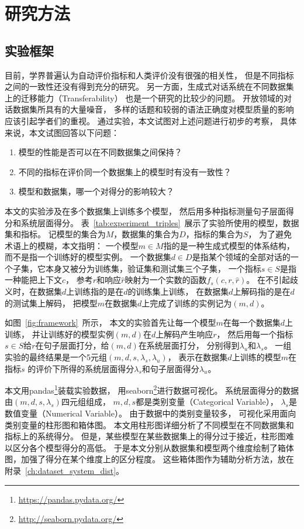 \chapter{研究方法}\label{ch:method}

\section{实验框架}\label{sec:eval_framework}
目前，学界普遍认为自动评价指标和人类评价没有很强的相关性，
但是不同指标之间的一致性还没有得到充分的研究。
另一方面，生成式对话系统在不同数据集上的迁移能力（Transferability）
也是一个研究的比较少的问题。
开放领域的对话数据集所具有的大量噪音，
多样的话题和较弱的语法正确度对模型质量的影响应该引起学者们的重视。
通过实验，本文试图对上述问题进行初步的考察，
具体来说，本文试图回答以下问题：
\begin{enumerate}
    \item 模型的性能是否可以在不同数据集之间保持？
    \item 不同的指标在评价同一个数据集上的模型时有没有一致性？
    \item 模型和数据集，哪一个对得分的影响较大？
\end{enumerate}

本文的实验涉及在多个数据集上训练多个模型，
然后用多种指标测量句子层面得分和系统层面得分。
表~\ref{tab:experiment_triples}~展示了实验所使用的模型，数据集和指标。
记模型的集合为$M$，数据集的集合为$D$，指标的集合为$S$，
为了避免术语上的模糊，本文指明：
一个模型$m \in M$指的是一种生成式模型的体系结构，而不是指一个训练好的模型实例。
一个数据集$d \in D$是指某个领域的全部对话的一个子集，它本身又被分为训练集，验证集和测试集三个子集，
一个指标$s \in S$是指一种能把上下文$c$，
参考$r$和响应$\hat{r}$映射为一个实数的函数$f_s(c, r, \hat{r})$。
在不引起歧义时，在数据集$d$上训练指的是在$d$的训练集上训练，
在数据集$d$上解码指的是在$d$的测试集上解码，
把模型$m$在数据集$d$上完成了训练的实例记为$(m, d)$。

如图~\ref{fig:framework}~所示，
本文的实验首先让每一个模型$m$在每一个数据集$d$上训练，
并让训练好的模型实例$(m, d)$在$d$上解码产生响应$r$，
然后用每一个指标$s \in S$给$r$在句子层面打分，给$(m, d)$在系统层面打分，
分别得到$\lambda_{u}$和$\lambda_{s}$。
一组实验的最终结果是一个5元组$(m, d, s, \lambda_{s}, \lambda_{u})$，
表示在数据集$d$上训练的模型$m$在指标$s$
的评价下所得的系统层面得分$\lambda_s$和句子层面得分$\lambda_u$。

本文用pandas\footnote{\url{https://pandas.pydata.org/}}装载实验数据，
用seaborn\footnote{\url{http://seaborn.pydata.org/}}进行数据可视化。
系统层面得分的数据由$(m, d, s, \lambda_s)$四元组组成，
$m, d, s$都是类别变量（Categorical Variable），
$\lambda_s$是数值变量（Numerical Variable）。
由于数据中的类别变量较多，
可视化采用面向类别变量的柱形图和箱体图。
本文用柱形图详细分析了不同模型在不同数据集和指标上的系统得分。
但是，某些模型在某些数据集上的得分过于接近，柱形图难以区分各个模型得分的高低。
于是本文分别从数据集和模型两个维度绘制了箱体图，加强了得分在某个维度上的区分程度。
这些箱体图作为辅助分析方法，放在附录~\ref{ch:dataset_system_dist}。

